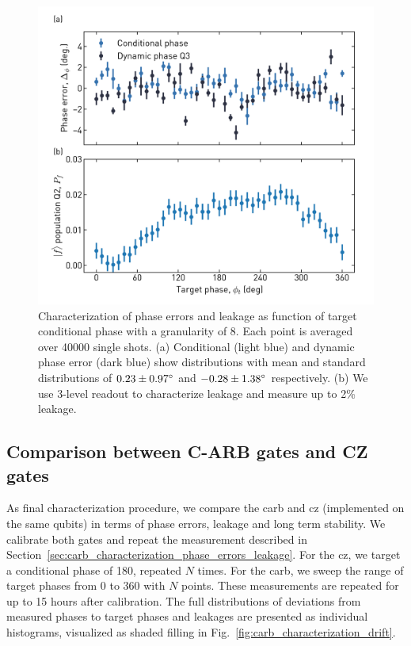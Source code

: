\begin{figure}[ht]
    \centering
    \includegraphics[width=\textwidth]{chapters/carb_gate/figs/ch4_characterization_phase_error_and_leakage_20200126_094856.pdf}
    \caption{Characterization of phase errors and leakage as function of target conditional phase with a granularity of 8\degree. Each point is averaged over 40000 single shots. (a) Conditional (light blue) and dynamic phase error (dark blue) show distributions with mean and standard distributions of $0.23\pm0.97^\circ$ and  $-0.28\pm1.38^\circ$ respectively. (b) We use 3-level readout to characterize leakage and measure up to 2\% leakage.}
    \label{fig:carb_characterization_phase_errors_leakage}
\end{figure}

\subsection{Comparison between C-ARB gates and CZ gates}
As final characterization procedure, we compare the \gls{carb} and \gls{cz} (implemented on the same qubits) in terms of phase errors, leakage and long term stability. We calibrate both gates and repeat the measurement described in Section~\ref{sec:carb_characterization_phase_errors_leakage}. For the \gls{cz}, we target a conditional phase of 180\degree, repeated $N$ times.  For the \gls{carb}, we sweep the range of target phases from 0 to 360\degree{} with $N$ points. These measurements are repeated for up to 15 hours after calibration. The full distributions of deviations from measured phases to target phases and leakages are presented as individual histograms, visualized as shaded filling in Fig.~\ref{fig:carb_characterization_drift}.


